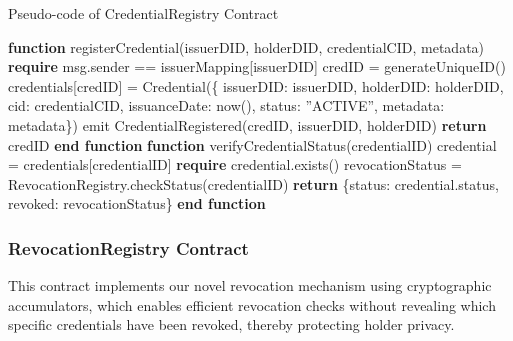 \documentclass[lettersize,journal]{IEEEtran}
\begin{document}
\begin{algorithm}
\caption{Pseudo-code of CredentialRegistry Contract}
\label{alg:credential_registry}
\begin{algorithmic}[1]
\STATE \textbf{function} registerCredential(issuerDID, holderDID, credentialCID, metadata)
\STATE \quad \textbf{require} msg.sender == issuerMapping[issuerDID]
\STATE \quad credID = generateUniqueID()
\STATE \quad credentials[credID] = Credential(\{
\STATE \quad \quad issuerDID: issuerDID, 
\STATE \quad \quad holderDID: holderDID, 
\STATE \quad \quad cid: credentialCID, 
\STATE \quad \quad issuanceDate: now(), 
\STATE \quad \quad status: ”ACTIVE”, 
\STATE \quad \quad metadata: metadata\})
\STATE \quad emit CredentialRegistered(credID, issuerDID, holderDID)
\STATE \quad \textbf{return} credID
\STATE \textbf{end function}
\STATE
\STATE \textbf{function} verifyCredentialStatus(credentialID)
\STATE \quad credential = credentials[credentialID]
\STATE \quad \textbf{require} credential.exists()
\STATE \quad revocationStatus = RevocationRegistry.checkStatus(credentialID)
\STATE \quad \textbf{return} \{status: credential.status, revoked: revocationStatus\}
\STATE \textbf{end function}
\end{algorithmic}
\end{algorithm}

\subsubsection{RevocationRegistry Contract} This contract implements our novel revocation mechanism using cryptographic accumulators, which enables efficient revocation checks without revealing which specific credentials have been revoked, thereby protecting holder privacy.
\end{document}
